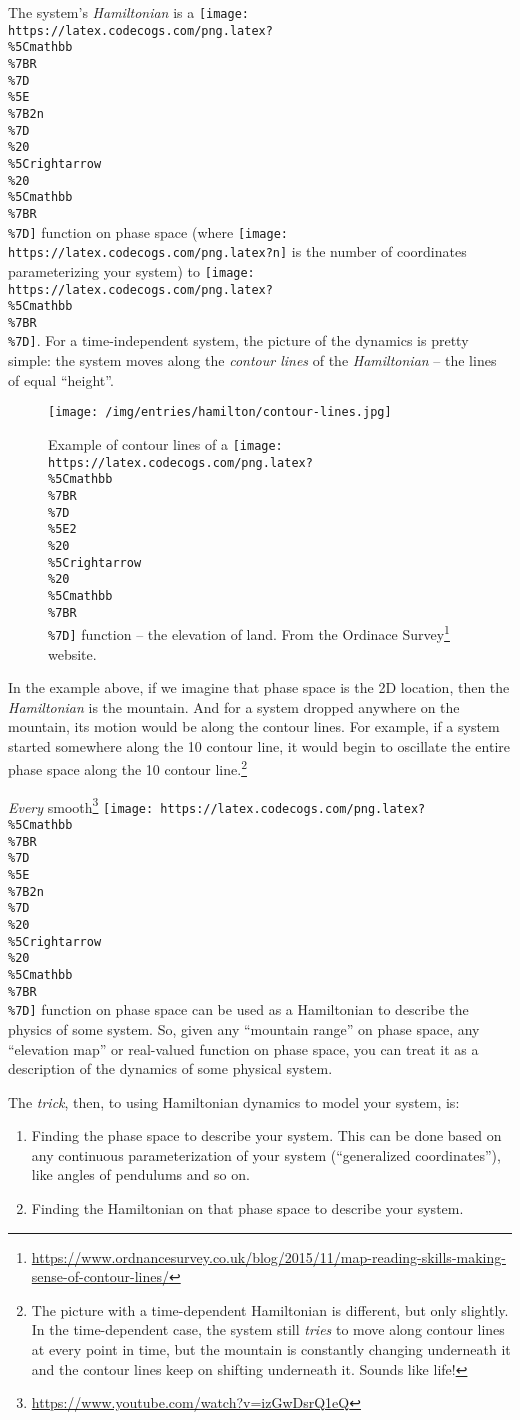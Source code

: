 \documentclass[]{article}
\renewcommand{\href}[2]{#2\footnote{\url{#1}}}
\begin{document}
The system's \emph{Hamiltonian} is a
\texttt{[image: https://latex.codecogs.com/png.latex?\\\%5Cmathbb\\\%7BR\\\%7D\\\%5E\\\%7B2n\\\%7D\\\%20\\\%5Crightarrow\\\%20\\\%5Cmathbb\\\%7BR\\\%7D]}
function on phase space (where
\texttt{[image: https://latex.codecogs.com/png.latex?n]} is the number of
coordinates parameterizing your system) to
\texttt{[image: https://latex.codecogs.com/png.latex?\\\%5Cmathbb\\\%7BR\\\%7D]}. For
a time-independent system, the picture of the dynamics is pretty simple: the
system moves along the \emph{contour lines} of the \emph{Hamiltonian} -- the
lines of equal ``height''.

\begin{figure}
\centering
\texttt{[image: /img/entries/hamilton/contour-lines.jpg]}
\caption{Example of contour lines of a
\texttt{[image: https://latex.codecogs.com/png.latex?\\\%5Cmathbb\\\%7BR\\\%7D\\\%5E2\\\%20\\\%5Crightarrow\\\%20\\\%5Cmathbb\\\%7BR\\\%7D]}
function -- the elevation of land. From the
\href{https://www.ordnancesurvey.co.uk/blog/2015/11/map-reading-skills-making-sense-of-contour-lines/}{Ordinace
Survey} website.}
\end{figure}

In the example above, if we imagine that phase space is the 2D location, then
the \emph{Hamiltonian} is the mountain. And for a system dropped anywhere on the
mountain, its motion would be along the contour lines. For example, if a system
started somewhere along the 10 contour line, it would begin to oscillate the
entire phase space along the 10 contour line.\footnote{The picture with a
  time-dependent Hamiltonian is different, but only slightly. In the
  time-dependent case, the system still \emph{tries} to move along contour lines
  at every point in time, but the mountain is constantly changing underneath it
  and the contour lines keep on shifting underneath it. Sounds like life!}

\emph{Every} \href{https://www.youtube.com/watch?v=izGwDsrQ1eQ}{smooth}
\texttt{[image: https://latex.codecogs.com/png.latex?\\\%5Cmathbb\\\%7BR\\\%7D\\\%5E\\\%7B2n\\\%7D\\\%20\\\%5Crightarrow\\\%20\\\%5Cmathbb\\\%7BR\\\%7D]}
function on phase space can be used as a Hamiltonian to describe the physics of
some system. So, given any ``mountain range'' on phase space, any ``elevation
map'' or real-valued function on phase space, you can treat it as a description
of the dynamics of some physical system.

The \emph{trick}, then, to using Hamiltonian dynamics to model your system, is:

\begin{enumerate}
\def\labelenumi{\arabic{enumi}.}
\item
  Finding the phase space to describe your system. This can be done based on any
  continuous parameterization of your system (``generalized coordinates''), like
  angles of pendulums and so on.
\item
  Finding the Hamiltonian on that phase space to describe your system.
\end{enumerate}
\end{document}
